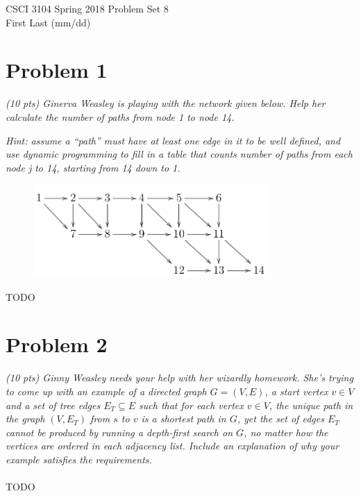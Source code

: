 \documentclass[12pt]{article} \setlength{\oddsidemargin}{0in}
\begin{document}
\noindent CSCI 3104 Spring 2018 \hfill Problem Set 8\\
First Last (mm/dd)

\graphicspath{ {images/} }

\hrulefill

{\selectfont}

\section*{Problem 1}

\textit{(10 pts) Ginerva Weasley is playing with the network given
  below. Help her calculate the number of paths from node 1 to node
  14.}

\textit{Hint: assume a ``path'' must have at least one edge in it to
  be well defined, and use dynamic programming to fill in a table that
  counts number of paths from each node j to 14, starting from 14 down
  to 1.}


\begin{figure}[h]
  \centering \includegraphics[width=0.8\textwidth]{P1}
\end{figure}

TODO

\newpage

\section*{Problem 2}

\textit{(10 pts) Ginny Weasley needs your help with her wizardly
  homework. She’s trying to come up with an example of a directed
  graph $G = (V, E)$, a start vertex $v \in V$ and a set of tree edges
  $E_T \subseteq E$ such that for each vertex $v \in V$, the unique path in the
  graph $(V, E_T)$ from $s$ to $v$ is a shortest path in $G$, yet the
  set of edges $E_T$ cannot be produced by running a depth-first
  search on $G$, no matter how the vertices are ordered in each
  adjacency list. Include an explanation of why your example satisfies
  the requirements.}
\\\\
TODO
\end{document}
